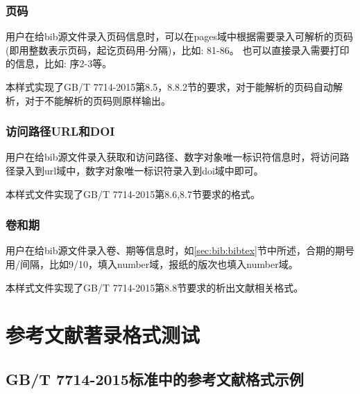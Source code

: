 \subsubsection{页码}\label{sec:fmt:pages}
\begin{property}{}{}
用户在给bib源文件录入页码信息时，可以在pages域中根据需要录入可解析的页码(即用整数表示页码，起讫页码用-分隔)，比如: 81-86。 也可以直接录入需要打印的信息，比如: 序2-3等。

本样式实现了GB/T 7714-2015第8.5，8.8.2节的要求，对于能解析的页码自动解析，对于不能解析的页码则原样输出。
\end{property}

\subsubsection{访问路径URL和DOI}
\begin{property}{}{}
用户在给bib源文件录入获取和访问路径、数字对象唯一标识符信息时，将访问路径录入到url域中，数字对象唯一标识符录入到doi域中即可。

本样式文件实现了GB/T 7714-2015第8.6,8.7节要求的格式。
\end{property}

\subsubsection{卷和期}\label{sec:fmt:volnum}
\begin{property}{}{}%
用户在给bib源文件录入卷、期等信息时，如\ref{sec:bib:bibtex}节中所述，合期的期号用/间隔，比如9/10，填入number域，报纸的版次也填入number域。

本样式文件实现了GB/T 7714-2015第8.8节要求的析出文献相关格式。
\end{property}




\section{参考文献著录格式测试}

\subsection{GB/T 7714-2015标准中的参考文献格式示例}\label{sec:eg:gb77142015}

